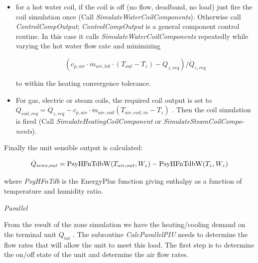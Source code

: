 \begin{itemize}
  \item
    for a hot water coil, if the coil is off (no flow, deadband, no load) just fire the coil simulation once (Call \emph{SimulateWaterCoilComponents}). Otherwise call \emph{ControlCompOutput}; \emph{ControlCompOutput} is a general component control routine. In this case it calls \emph{SimulateWaterCoilComponents} repeatedly while varying the hot water flow rate and minimizing

\begin{equation}
  ({c_{p,air}}\cdot {\dot m_{air,tot}}\cdot ({T_{out}} - {T_z}) - {\dot Q_{z,req}})/{\dot Q_{z,req}}
\end{equation}

to within the heating convergence tolerance.
  \item
    For gas, electric or steam coils, the required coil output is set to \({\dot Q_{coil,req}} = {\dot Q_{z,req}} - {c_{p,air}}\cdot {\dot m_{air,coil}}({T_{air,coil,in}} - {T_z})\) . Then the coil simulation is fired (Call \emph{SimulateHeatingCoilComponent} or \emph{SimulateSteamCoilCompo-nents}).
\end{itemize}

Finally the unit sensible output is calculated:

\begin{equation}
{\dot Q_{sens,out}} = {\rm{PsyHFnTdbW}}({T_{air,out}},{W_z}) - {\rm{PsyHFnTdbW(}}{T_z},{W_z})
\end{equation}

where \emph{PsyHFnTdb} is the EnergyPlus function giving enthalpy as a function of temperature and humidity ratio.

\emph{Parallel}

From the result of the zone simulation we have the heating/cooling demand on the terminal unit \({\dot Q_{tot}}\) . The subroutine \emph{CalcParallelPIU} needs to determine the flow rates that will allow the unit to meet this load. The first step is to determine the on/off state of the unit and determine the air flow rates.

